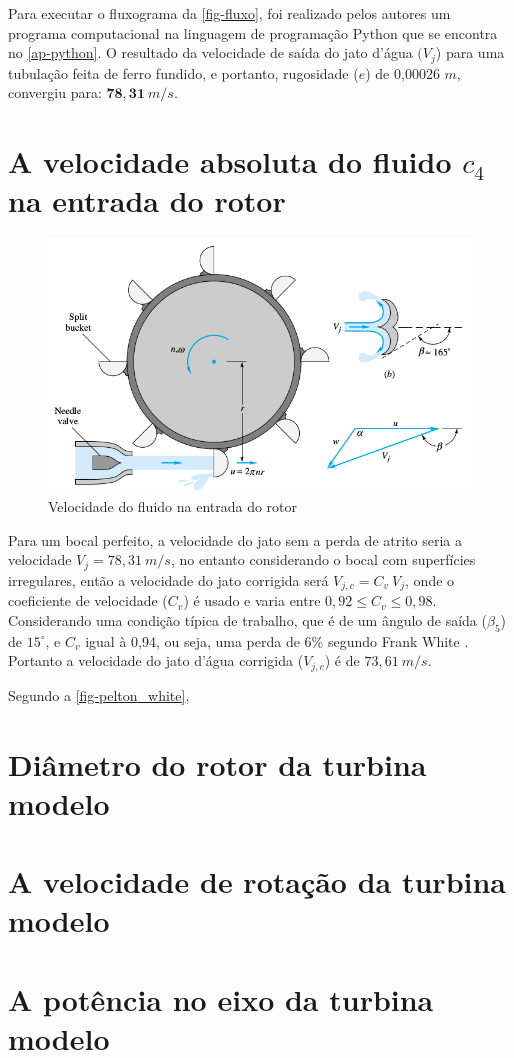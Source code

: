     Para executar o fluxograma da \autoref{fig-fluxo}, foi realizado pelos autores um programa computacional na linguagem de programação Python que se encontra no \autoref{ap-python}. O resultado da velocidade de saída do jato d'água $(V_j$) para uma tubulação feita de ferro fundido, e portanto, rugosidade ($e$) de 0,00026 $m$, convergiu para: $\mathbf{78,31\:} m/s$.

\section{A velocidade absoluta do fluido $c_4$ na entrada do rotor}

    \begin{figure}[htb]
        \centering
        \caption{\label{fig-pelton_white} Velocidade do fluido na entrada do rotor}
        \includegraphics[scale=0.5]{images/pelton_turbine.png}
    \end{figure}

    Para um bocal perfeito, a velocidade do jato sem a perda de atrito seria a velocidade $V_j = 78,31 \: m/s$, no entanto considerando o bocal com superfícies irregulares, então a velocidade do jato corrigida será $V_{j,c} =  C_v \: V_{j}$, onde o coeficiente de velocidade ($C_v$) é usado e varia entre $0,92 \leq C_v \leq 0,98$. Considerando uma condição típica de trabalho, que é de um ângulo de saída ($\beta_5$) de $15^{\circ}$, e $C_v$ igual à 0,94, ou seja, uma perda de 6\% segundo Frank White \cite{white}. Portanto a velocidade do jato d'água corrigida ($V_{j,c}$) é de  $73,61\: m/s$.

    Segundo a \autoref{fig-pelton_white},


\section{Diâmetro do rotor da turbina modelo}

\section{A velocidade de rotação da turbina modelo}

\section{A potência no eixo da turbina modelo}
